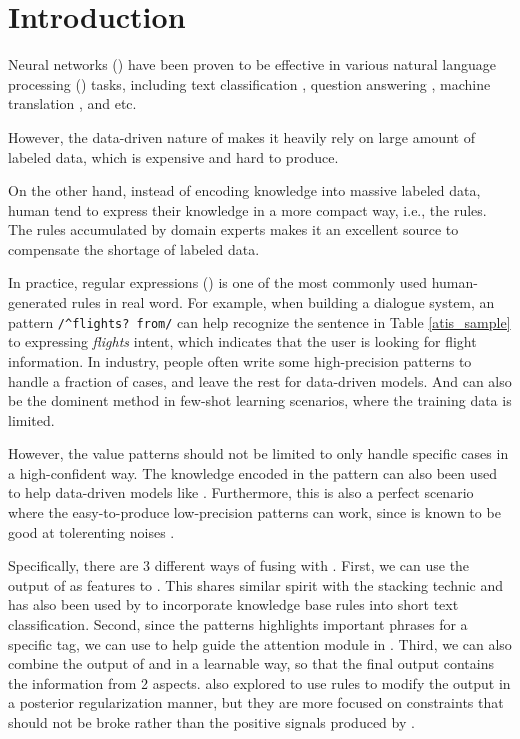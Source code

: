 \section{Introduction}

Neural networks (\NN) have been proven to be effective in various natural language processing (\NLP) tasks, including text classification \cite{kim2014convolutional}, question answering \cite{yih2015semantic}, machine translation \cite{bahdanau2014neural}, and etc.

However, the data-driven nature of \NN makes it heavily rely on large amount of labeled data, which is expensive and hard to produce.

On the other hand, instead of encoding knowledge into massive labeled data, human tend to express their knowledge in a more compact way, i.e., the rules. The rules accumulated by domain experts makes it an excellent source to compensate the shortage of labeled data.

In practice, regular expressions (\RE) is one of the most commonly used human-generated rules in real word. 
For example, when building a dialogue system, an \RE pattern \texttt{/\textasciicircum flights? from/} can help recognize the sentence in Table \ref{atis_sample} to expressing \emph{flights} intent, which indicates that the user is looking for flight information.
In industry, people often write some high-precision \RE patterns to handle a fraction of cases, and leave the rest for data-driven models. And \RE can also be the dominent method in few-shot learning scenarios, where the training data is limited.

However, the value \RE patterns should not be limited to only handle specific cases in a high-confident way. The knowledge encoded in the pattern can also been used to help data-driven models like \NN. Furthermore, this is also a perfect scenario where the easy-to-produce low-precision patterns can work, since \NN is known to be good at tolerenting noises \cite{srivastava2014dropout, xie2016disturblabel}.

Specifically, there are 3 different ways of fusing \RE with \NN. First, we can use the output of \RE as features to \NN. This shares similar spirit with the stacking technic \cite{wolpert1992stacked} and has also been used by \cite{wangcombining17} to incorporate knowledge base rules into short text classification. Second, since the \RE patterns highlights important phrases for a specific tag, we can use \RE to help guide the attention module in \NN. Third, we can also combine the output of \RE and \NN in a learnable way, so that the final output contains the information from 2 aspects. \cite{hu2016deep} also explored to use rules to modify the \NN output in a posterior regularization manner, but they are more focused on constraints that should not be broke rather than the positive signals produced by \RE.

